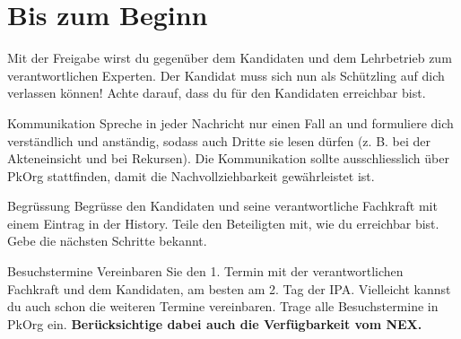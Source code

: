 \section{Bis zum Beginn}
Mit der Freigabe wirst du gegenüber dem Kandidaten und dem Lehrbetrieb zum verantwortlichen Experten. Der Kandidat muss sich nun als Schützling auf dich verlassen können! Achte darauf, dass du für den Kandidaten erreichbar bist.

\begin{taskitemwithoutcomment}{Kommunikation}
  Spreche in jeder Nachricht nur einen Fall an und formuliere dich verständlich und anständig, sodass auch Dritte sie lesen dürfen (z. B. bei der Akteneinsicht und bei Rekursen).
  Die Kommunikation sollte ausschliesslich über PkOrg stattfinden, damit die Nachvollziehbarkeit gewährleistet ist.
\end{taskitemwithoutcomment}
\begin{taskitemwithoutcomment}{Begrüssung}
  Begrüsse den Kandidaten und seine verantwortliche Fachkraft mit einem Eintrag in der History. Teile den Beteiligten mit, wie du erreichbar bist. Gebe die nächsten Schritte bekannt.
\end{taskitemwithoutcomment}
\begin{taskitem}{Besuchstermine}
  Vereinbaren Sie den 1. Termin mit der verantwortlichen Fachkraft und dem Kandidaten, am besten am 2. Tag der IPA. Vielleicht kannst du auch schon die weiteren Termine vereinbaren. Trage alle Besuchstermine in PkOrg ein. \textbf{Berücksichtige dabei auch die Verfügbarkeit vom NEX.}
\end{taskitem}